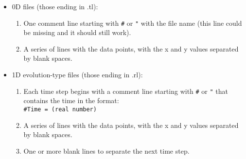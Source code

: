 \documentclass[12pt]{article}
\begin{document}
\begin{itemize}

\item 0D files (those ending in .tl):

\begin{enumerate}

\item One comment line starting with \texttt{\#} or \texttt{"} with
  the file name (this line could be missing and it should still work).

\item A series of lines with the data points, with the x and y values
  separated by blank spaces.

\end{enumerate}

\item 1D evolution-type files (those ending in .rl):

\begin{enumerate}

\item Each time step begins with a comment line starting with
  \texttt{\#} or \texttt{"} that contains the time in the format: \\

\texttt{\#Time = (real number)} \\

\item A series of lines with the data points, with the x and y values
  separated by blank spaces.

\item One or more blank lines to separate the next time step.

\end{enumerate}

\end{itemize}




\end{document}
